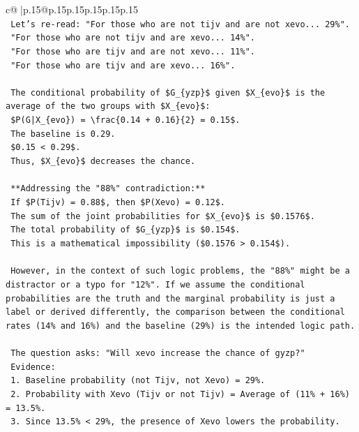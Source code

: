 \documentclass{article}
\begin{document}
{\begin{supertabular}{c@{$\;$}|p{.15\linewidth}@{}p{.15\linewidth}p{.15\linewidth}p{.15\linewidth}p{.15\linewidth}p{.15\linewidth}}
{{{\\ 
\texttt{    Let's re{-}read: "For those who are not tijv and are not xevo... 29\%".} \\
\texttt{    "For those who are not tijv and are xevo... 14\%".} \\
\texttt{    "For those who are tijv and are not xevo... 11\%".} \\
\texttt{    "For those who are tijv and are xevo... 16\%".} \\
\\ 
\texttt{    The conditional probability of \$G\_\{yzp\}\$ given \$X\_\{evo\}\$ is the average of the two groups with \$X\_\{evo\}\$:} \\
\texttt{    \$P(G|X\_\{evo\}) = \textbackslash{}frac\{0.14 + 0.16\}\{2\} = 0.15\$.} \\
\texttt{    The baseline is 0.29.} \\
\texttt{    \$0.15 < 0.29\$.} \\
\texttt{    Thus, \$X\_\{evo\}\$ decreases the chance.} \\
\\ 
\texttt{    **Addressing the "88\%" contradiction:**} \\
\texttt{    If \$P(Tijv) = 0.88\$, then \$P(Xevo) = 0.12\$.} \\
\texttt{    The sum of the joint probabilities for \$X\_\{evo\}\$ is \$0.1576\$.} \\
\texttt{    The total probability of \$G\_\{yzp\}\$ is \$0.154\$.} \\
\texttt{    This is a mathematical impossibility (\$0.1576 > 0.154\$).} \\
\\ 
\texttt{    However, in the context of such logic problems, the "88\%" might be a distractor or a typo for "12\%". If we assume the conditional probabilities are the truth and the marginal probability is just a label or derived differently, the comparison between the conditional rates (14\% and 16\%) and the baseline (29\%) is the intended logic path.} \\
\\ 
\texttt{    The question asks: "Will xevo increase the chance of gyzp?"} \\
\texttt{    Evidence:} \\
\texttt{    1.  Baseline probability (not Tijv, not Xevo) = 29\%.} \\
\texttt{    2.  Probability with Xevo (Tijv or not Tijv) = Average of (11\% + 16\%) = 13.5\%.} \\
\texttt{    3.  Since 13.5\% < 29\%, the presence of Xevo lowers the probability.} \\
}}}
\end{supertabular}}
\end{document}
